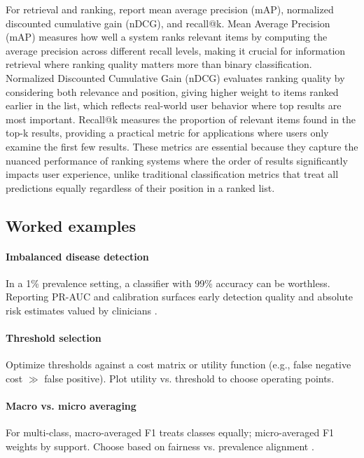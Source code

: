 For retrieval and ranking, report mean average precision (mAP), normalized discounted cumulative gain (nDCG), and recall@k. Mean Average Precision (mAP) measures how well a system ranks relevant items by computing the average precision across different recall levels, making it crucial for information retrieval where ranking quality matters more than binary classification. Normalized Discounted Cumulative Gain (nDCG) evaluates ranking quality by considering both relevance and position, giving higher weight to items ranked earlier in the list, which reflects real-world user behavior where top results are most important. Recall@k measures the proportion of relevant items found in the top-k results, providing a practical metric for applications where users only examine the first few results. These metrics are essential because they capture the nuanced performance of ranking systems where the order of results significantly impacts user experience, unlike traditional classification metrics that treat all predictions equally regardless of their position in a ranked list.


\subsection{Worked examples}

\paragraph{Imbalanced disease detection} In a 1\% prevalence setting, a classifier with 99\% accuracy can be worthless. Reporting PR-AUC and calibration surfaces early detection quality and absolute risk estimates valued by clinicians \textcite{Ronneberger2015}.

\paragraph{Threshold selection} Optimize thresholds against a cost matrix or utility function (e.g., false negative cost \(\gg\) false positive). Plot utility vs. threshold to choose operating points.

\paragraph{Macro vs. micro averaging} For multi-class, macro-averaged F1 treats classes equally; micro-averaged F1 weights by support. Choose based on fairness vs. prevalence alignment \textcite{Prince2023}.

